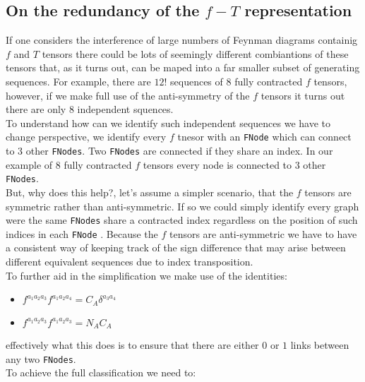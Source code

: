 \documentclass[a4paper]{article}
\def \FNode{\texttt{FNode} }
\def \FNodes{\texttt{FNodes} }
\begin{document}
\subsection{On the redundancy of the $f-T$ representation}
If one considers the interference of large numbers of Feynman diagrams containig $f$ and $T$ tensors there 
could be lots of seemingly different combiantions of these tensors that, as it turns out, can be maped into 
a far smaller subset of generating sequences. For example, there are $12!$ sequences of $8$ fully contracted $f$ tensors, however, if we make full use of the anti-symmetry of the $f$ tensors it turns out there are only $8$ independent squences.
\\ 

To understand how can we identify such independent sequences we have to change perspective, we identify every $f$ tnesor with an \texttt{FNode} which can connect to $3$ other \texttt{FNodes}.
Two \texttt{FNodes} are connected if they share an index. In our example of $8$ fully contracted $f$ tensors 
every node is connected to $3$ other \texttt{FNodes}.\\

But, why does this help?, let's assume a simpler scenario, that the $f$ tensors are symmetric rather than anti-symmetric. If so we could simply identify every graph were the same \FNodes share a contracted index
regardless on the position of such indices in each \FNode. Because the $f$ tensors are anti-symmetric 
we have to have a consistent way of keeping track of the sign difference that may arise between 
different equivalent sequences due to index transposition.\\

To further aid in the simplification we make use of the identities:
\begin{itemize}
 \item $f^{a_1 a_2 a_3} f^{a_1a_2a_4} = C_A \delta^{a_3a_4}$
 \item $f^{a_1 a_2 a_3} f^{a_1a_2a_3} = N_A C_A $
\end{itemize}
effectively what this does is to ensure that there are either $0$ or $1$ links between any two \texttt{FNodes}.\\

\noindent To achieve the full classification we need to:
\end{document}

